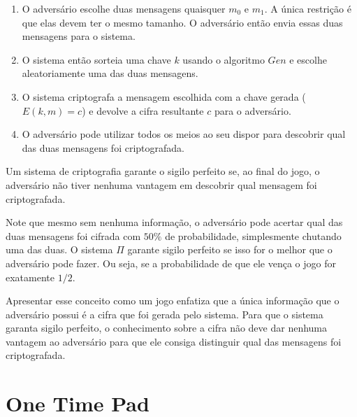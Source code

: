 \begin{enumerate}
\item O adversário escolhe duas mensagens quaisquer $m_0$ e $m_1$.
  A única restrição é que elas devem ter o mesmo tamanho.
  O adversário então envia essas duas mensagens para o sistema.
\item O sistema então sorteia uma chave $k$ usando o algoritmo $Gen$ e escolhe aleatoriamente uma das duas mensagens.
\item O sistema criptografa a mensagem escolhida com a chave gerada  ($E(k,m) = c$) e devolve a cifra resultante $c$ para o adversário.
\item O adversário pode utilizar todos os meios ao seu dispor para descobrir qual das duas mensagens foi criptografada.
\end{enumerate}

Um sistema de criptografia garante o sigilo perfeito se, ao final do jogo, o adversário não tiver nenhuma vantagem em descobrir qual mensagem foi criptografada.

\begin{center}
\end{center}

Note que mesmo sem nenhuma informação, o adversário pode acertar qual das duas mensagens foi cifrada com $50\%$ de probabilidade, simplesmente chutando uma das duas.
O sistema $\Pi$ garante sigilo perfeito se isso for o melhor que o adversário pode fazer.
Ou seja, se a probabilidade de que ele vença o jogo for exatamente $1/2$.

Apresentar esse conceito como um jogo enfatiza que a única informação que o adversário possui é a cifra que foi gerada pelo sistema.
Para que o sistema garanta sigilo perfeito, o conhecimento sobre a cifra não deve dar nenhuma vantagem ao adversário para que ele consiga distinguir qual das mensagens foi criptografada.

\section{One Time Pad}
\label{sec:otp}

